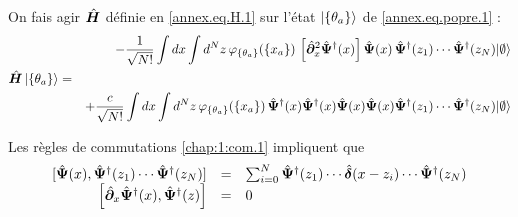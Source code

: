 On fais agir $\hat{\bm{H}}$ définie en \eqref{annex.eq.H.1} sur l'état $\ket{\{ \theta_a \}}$ de \eqref{annex.eq.popre.1} :
\begin{eqnarray}
    & & - \frac{1}{ \sqrt{N!}} \int dx \int d^N z \, \varphi_{\{ \theta_a \}} ( \{x_a\}) \,    \left [\hat{\bm{\partial}}_x^2 \hat{\bm{\Psi}}^\dag(x)\right ] \hat{\bm{\Psi}}(x)\,  \hat{\bm{\Psi}}^\dag(z_1) \cdots \hat{\bm{\Psi}}^\dag(z_N) \vert \emptyset \rangle \label{chap:1:hal.mod.3.1}\\
    \hat{\bm{H}}\ket{\{\theta_a\}} & = & \nonumber \\
    & & +\frac{c}{ \sqrt{N!}} \int dx \int d^N z \, \varphi_{\{ \theta_a \}} ( \{x_a\})     \, \hat{\bm{\Psi}}^\dag(x)\hat{\bm{\Psi}}^\dag(x) \hat{\bm{\Psi}}(x)\hat{\bm{\Psi}}(x)  \hat{\bm{\Psi}}^\dag(z_1) \cdots \hat{\bm{\Psi}}^\dag(z_N) \vert \emptyset \rangle \label{chap:1:hal.mod.3.1}
\end{eqnarray}

Les règles de commutations \eqref{chap:1:com.1} impliquent que
\begin{eqnarray}
    \left . \begin{array}{rcl}
        [ \hat{\bm{\Psi}}(x),  \hat{\bm{\Psi}}^\dag(z_1)\cdots \hat{\bm{\Psi}}^\dag(z_N)  ]  &=&  \sum_{i = 0}^{N} \hat{\bm{\Psi}}^\dag(z_1) \cdots \hat{\bm{\delta}}(x-z_i) \cdots \hat{\bm{\Psi}}^\dag(z_N)  \\
        \left [ \hat{\bm{\partial}}_x\hat{\bm{\Psi}}^\dag(x),  \hat{\bm{\Psi}}^\dag(z) \right ]   & =  & 0
    \end{array} \right . \label{chap:1:com.2}
\end{eqnarray}


